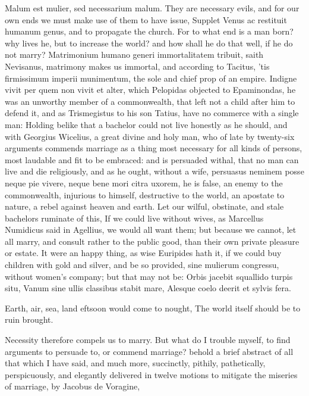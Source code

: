 Malum est mulier, sed necessarium malum. They are necessary
evils, and for our own ends we must make use of them to have issue,
 Supplet Venus ac restituit humanum genus, and to propagate the
church. For to what end is a man born? why lives he, but to increase
the world? and how shall he do that well, if he do not marry?
Matrimonium humano generi immortalitatem tribuit, saith Nevisanus,
matrimony makes us immortal, and according to Tacitus, 'tis
firmissimum imperii munimentum, the sole and chief prop of an empire.
Indigne vivit per quem non vivit et alter, which Pelopidas
objected to Epaminondas, he was an unworthy member of a commonwealth,
that left not a child after him to defend it, and as Trismegistus
to his son Tatius, have no commerce with a single man: Holding belike
that a bachelor could not live honestly as he should, and with Georgius
Wicelius, a great divine and holy man, who of late by twenty-six
arguments commends marriage as a thing most necessary for all kinds of
persons, most laudable and fit to be embraced: and is persuaded withal,
that no man can live and die religiously, and as he ought, without a
wife, persuasus neminem posse neque pie vivere, neque bene mori citra
uxorem, he is false, an enemy to the commonwealth, injurious to
himself, destructive to the world, an apostate to nature, a rebel
against heaven and earth. Let our wilful, obstinate, and stale
bachelors ruminate of this, If we could live without wives, as
Marcellus Numidicus said in  Agellius, we would all want them;
but because we cannot, let all marry, and consult rather to the public
good, than their own private pleasure or estate. It were an happy
thing, as wise Euripides hath it, if we could buy children with
gold and silver, and be so provided, sine mulierum congressu, without
women's company; but that may not be:
Orbis jacebit squallido turpis situ,
Vanum sine ullis classibus stabit mare,
Alesque coelo deerit et sylvis fera.

Earth, air, sea, land eftsoon would come to nought,
The world itself should be to ruin brought.

Necessity therefore compels us to marry.
But what do I trouble myself, to find arguments to persuade to, or
commend marriage? behold a brief abstract of all that which I have
said, and much more, succinctly, pithily, pathetically, perspicuously,
and elegantly delivered in twelve motions to mitigate the miseries of
marriage, by  Jacobus de Voragine,

